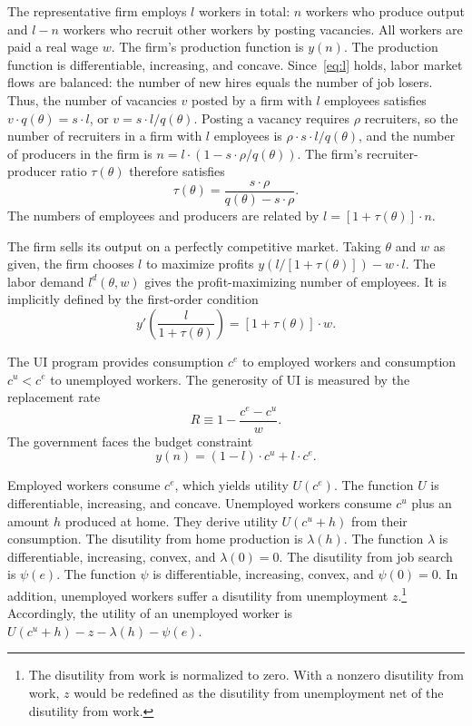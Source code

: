 \documentclass[letterpaper,12pt,leqno]{article}
\newcommand{\pre}[1]{\left( #1 \right)}
\newcommand{\brk}[1]{\left[ #1 \right]}
\def \t{{\theta}}
\def \l{{\lambda}}
\def \p{{\psi}}
\def \r{{\rho}}
\begin{document}
The representative firm employs $l$ workers in total: $n$ workers who produce output and $l-n$ workers who recruit other workers by posting vacancies. All workers are paid a real wage $w$. The firm's production function is $y(n)$. The production function is differentiable, increasing, and concave. Since~\eqref{eq:l} holds, labor market flows are balanced: the number of new hires equals the number of job losers. Thus, the number of vacancies $v$ posted by a firm with $l$ employees satisfies $v\cdot q(\t) = s\cdot l$, or $v=s\cdot l/ q(\t)$. Posting a vacancy requires $\r$ recruiters, so the number of recruiters in a firm with $l$ employees is $ \r \cdot s\cdot l/q(\t)$, and the number of producers in the firm is  $n=l\cdot \pre{1-s\cdot \r/q(\t)}$. The firm's recruiter-producer ratio $\tau(\t)$ therefore satisfies 
\begin{equation}
\tau(\t)= \frac{s\cdot\r}{q(\t)-s\cdot \r}.
\label{eq:taucps}\end{equation} 
The numbers of employees and producers are related by $l=\brk{1+\tau(\t)}\cdot n$.

The firm sells its output on a perfectly competitive market. Taking $\t$ and $w$ as given, the firm chooses $l$ to maximize profits $y(l/\brk{1+\tau(\t)})- w \cdot l$. The labor demand $l^{d}(\t,w)$ gives the profit-maximizing number of employees. It is implicitly defined by the first-order condition
\begin{equation*}
y'\pre{\frac{l}{1+\tau(\t)}}= \brk{1+\tau(\t)}\cdot w. 
\end{equation*} 

The UI program provides consumption $c^e$ to employed workers and consumption $c^u<c^{e}$ to unemployed workers. The generosity of UI is measured by the replacement rate 
\begin{equation*}
R \equiv 1-\frac{c^e-c^u}{w}. 
\end{equation*}
The government faces the budget constraint
\begin{equation}
y(n)=(1-l)\cdot c^{u}+l\cdot c^{e}.
\label{eq:budget}\end{equation}

Employed workers consume $c^{e}$, which yields utility $U(c^{e})$. The function $U$ is differentiable, increasing, and concave.  Unemployed workers consume $c^{u}$ plus an amount $h$ produced at home. They derive utility $U(c^{u}+h)$ from their consumption. The disutility from home production is $\l(h)$. The function $\l$ is differentiable, increasing, convex, and $\l(0)=0$. The disutility from job search is $\p(e)$. The function $\p$ is differentiable, increasing, convex, and $\p(0)=0$. In addition, unemployed workers suffer a disutility from unemployment $z$.\footnote{The disutility from work is normalized to zero. With a nonzero disutility from work, $z$ would be redefined as the disutility from unemployment net of the disutility from work.} Accordingly, the utility of an unemployed worker is $U(c^{u}+h)-z-\l(h)-\p(e)$.
\end{document}
